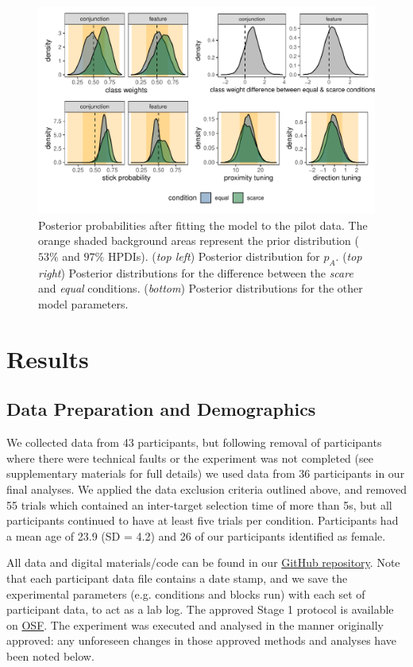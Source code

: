 \documentclass[12pt]{article}
\begin{document}
\begin{figure}[H]
    \centering
    \includegraphics[width=\textwidth]{figs/pilot_data.pdf}
    \caption{Posterior probabilities after fitting the model to the pilot data. The orange shaded background areas represent the prior distribution ($53\%$ and $97\%$ HPDIs). (\textit{top left}) Posterior distribution for $p_A$. (\textit{top right}) Posterior distributions for the difference between the \textit{scare} and \textit{equal} conditions. (\textit{bottom}) Posterior distributions for the other model parameters.}
    \label{fig:pilot_data}
\end{figure}

\section{Results}

\subsection{Data Preparation and Demographics}

We collected data from 43 participants, but following removal of participants where there were technical faults or the experiment was not completed (see supplementary materials for full details) we used data from 36 participants in our final analyses. We applied the data exclusion criteria outlined above, and removed 55 trials which contained an inter-target selection time of more than 5s, but all participants continued to have at least five trials per condition. Participants had a mean age of 23.9 (SD = 4.2) and 26 of our participants identified as female.

All data and digital materials/code can be found in our \href{https://github.com/Riadsala/foraging_scarcity}{GitHub repository}. Note that each participant data file contains a date stamp, and we save the experimental parameters (e.g. conditions and blocks run) with each set of participant data, to act as a lab log. The approved Stage 1 protocol is available on \href{https://osf.io/dhjs5/}{OSF}. The experiment was executed and analysed in the manner originally approved: any unforeseen changes in those approved methods and analyses have been noted below.
\end{document}

